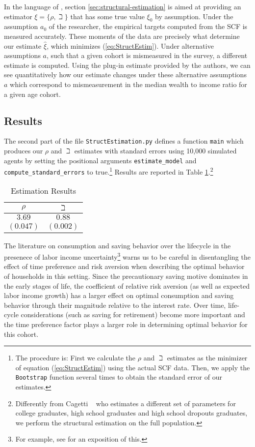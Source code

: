 \documentclass[titlepage, headings=optiontotocandhead]{Resources/texmf-local/tex/latex/econtex}
\begin{document}
In the language of \cite{andrews2017measuring}, section \ref{sec:structural-estimation} is aimed at providing an estimator $\xi =\{\rho ,\beth\}$ that has some true value $\xi_0 $ by assumption. Under the assumption $a_0$ of the researcher, the empirical targets computed from the SCF is measured accurately. These moments of the data are precisely what determine our estimate $\hat{\xi}$, which minimizes (\ref{eq:StructEstim}). Under alternative assumptions $a$, such that a given cohort is mismeasured in the survey, a different estimate is computed. Using the plug-in estimate provided by the authors, we can see quantitatively how our estimate changes under these alternative assumptions $a$ which correspond to mismeasurement in the median wealth to income ratio for a given age cohort.

\subsection{Results}
The second part of the file \texttt{StructEstimation.py}
defines a function \texttt{main} which produces our $\rho$ and
$\beth$ estimates with standard errors using 10,000 simulated
agents by setting the positional arguments \texttt{estimate\_model} and
\texttt{compute\_standard\_errors} to true.\footnote{The procedure is: First we calculate the $\rho$ and
  $\beth$ estimates as the minimizer of equation
  (\ref{eq:StructEstim}) using the actual SCF data. Then, we apply the
  \texttt{Bootstrap} function several times to obtain the standard
  error of our estimates.} Results are reported in Table
\ref{tab:EstResults}.\footnote{Differently from Cagetti
  ~\citeyearpar{cagettiWprofiles} who estimates a different set of
  parameters for college graduates, high school graduates and high
  school dropouts graduates, we perform the structural estimation on
  the full population.}


  \begin{table}[h]
    \caption{Estimation Results}\label{tab:EstResults}
    \center
    \begin{tabular}{cc}
      \hline
      $\rho $ & $\beth$\\
      \hline
      $3.69$ & $0.88$\\
      $(0.047)$ & $(0.002)$\\
      \hline
    \end{tabular}
  \end{table}

The literature on consumption and saving behavior over the lifecycle in the presenece of labor income uncertainty\footnote{For example, see \cite{gpLifecycle} for an exposition of this.} warns us to be careful in disentangling the effect of time preference and risk aversion when describing the optimal behavior of households in this setting.  Since the precautionary saving motive dominates in the early stages of life, the coefficient of relative risk aversion (as well as expected labor income growth) has a larger effect on optimal consumption and saving behavior through their magnitude relative to the interest rate. Over time, life-cycle considerations (such as saving for retirement) become more important and the time preference factor plays a larger role in determining optimal behavior for this cohort.
\end{document}
